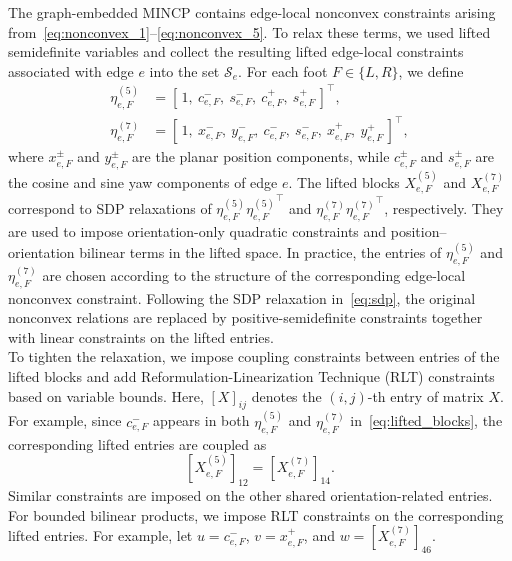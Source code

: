 \documentclass[letterpaper, 10 pt, journal, twoside]{IEEEtran}
\begin{document}
The graph-embedded MINCP contains edge-local nonconvex constraints arising from~\eqref{eq:nonconvex_1}--\eqref{eq:nonconvex_5}.
To relax these terms, we used lifted semidefinite variables and collect the resulting lifted edge-local constraints associated with edge $e$ into the set $\mathcal S_e$.
For each foot $F\in\{L,R\}$, we define
\begin{equation}\label{eq:lifted_blocks}
\begin{aligned}
\eta_{e,F}^{(5)} &= [\,1,\ c_{e,F}^{-},\ s_{e,F}^{-},\ c_{e,F}^{+},\ s_{e,F}^{+}\,]^{\top},\\
\eta_{e,F}^{(7)} &= [\,1,\ x_{e,F}^{-},\ y_{e,F}^{-},\ c_{e,F}^{-},\ s_{e,F}^{-},\ x_{e,F}^{+},\ y_{e,F}^{+}\,]^{\top},
\end{aligned}
\end{equation}
\noindent where \(x_{e,F}^{\pm}\) and \(y_{e,F}^{\pm}\) are the planar position components, while \(c_{e,F}^{\pm}\) and \(s_{e,F}^{\pm}\) are the cosine and sine yaw components of edge \(e\).
The lifted blocks $X_{e,F}^{(5)}$ and $X_{e,F}^{(7)}$ correspond to SDP relaxations of $\eta_{e,F}^{(5)}{\eta_{e,F}^{(5)}}^{\top}$ and $\eta_{e,F}^{(7)}{\eta_{e,F}^{(7)}}^{\top}$, respectively.
They are used to impose orientation-only quadratic constraints and position--orientation bilinear terms in the lifted space.
In practice, the entries of $\eta_{e,F}^{(5)}$ and $\eta_{e,F}^{(7)}$ are chosen according to the structure of the corresponding edge-local nonconvex constraint.
Following the SDP relaxation in~\eqref{eq:sdp}, the original nonconvex relations are replaced by positive-semidefinite constraints together with linear constraints on the lifted entries.
\\
\indent
To tighten the relaxation, we impose coupling constraints between entries of the lifted blocks and add Reformulation-Linearization Technique (RLT) constraints based on variable bounds.
Here, \([X]_{ij}\) denotes the \((i,j)\)-th entry of matrix \(X\).
For example, since $c_{e,F}^{-}$ appears in both $\eta_{e,F}^{(5)}$ and $\eta_{e,F}^{(7)}$ in~\eqref{eq:lifted_blocks}, the corresponding lifted entries are coupled as
\begin{equation}
\left[X_{e,F}^{(5)}\right]_{12} = \left[ X_{e,F}^{(7)}\right]_{14}.
\label{eq:coupling_example}
\end{equation}
Similar constraints are imposed on the other shared orientation-related entries.
For bounded bilinear products, we impose RLT constraints on the corresponding lifted entries.
For example, let $u=c_{e,F}^{-}$, $v=x_{e,F}^{+}$, and $w=\left[ X_{e,F}^{(7)}\right]_{46}$.
\end{document}
